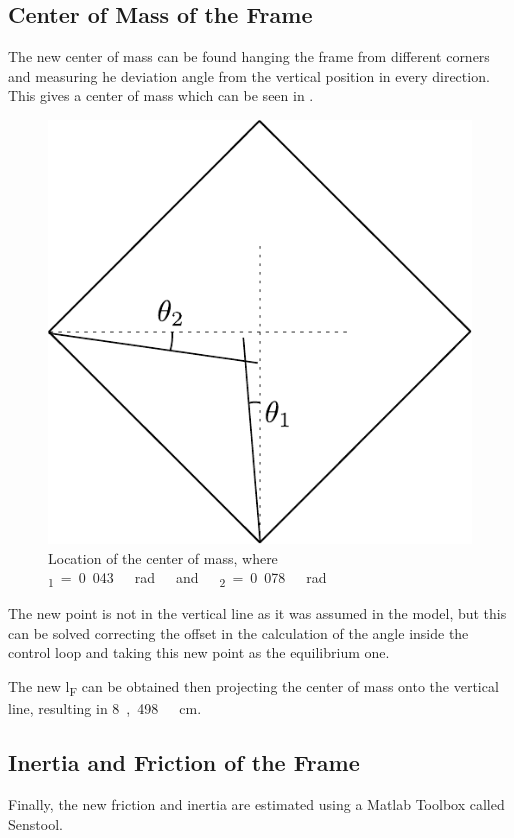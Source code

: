 \subsection{Center of Mass of the Frame}
The new center of mass can be found hanging the frame from different corners and measuring he deviation angle from the vertical position in every direction. This gives a center of mass which can be seen in . 
\begin{figure}[H]
	\centering
	\includegraphics[scale=0.6]{figures/centerOfMassDiagram}
	\caption{Location of the center of mass, where \si{\theta_1=0.043\ rad\ and\ \theta_2=0.078\ rad}}
	\label{centerOfMassDiagram}
\end{figure}


The new point is not in the vertical line as it was assumed in the model, but this can be solved correcting the offset in the calculation of the angle inside the control loop and taking this new point as the equilibrium one. 

The new \si{l_F} can be obtained then projecting the center of mass onto the vertical line, resulting in \si{8,498\ cm}.

\subsection{Inertia and Friction of the Frame}
Finally, the new friction and inertia are estimated using a Matlab Toolbox called Senstool. 

